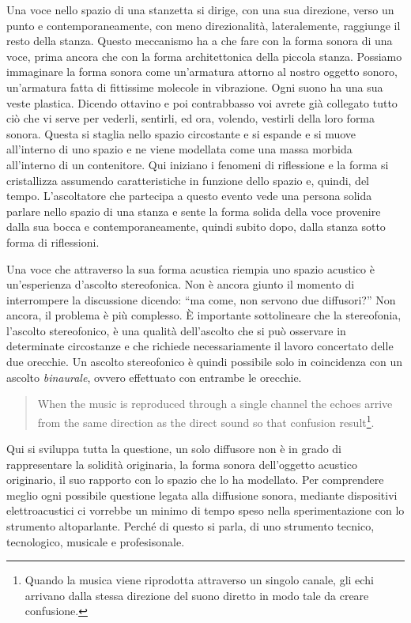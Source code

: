\documentclass[a4paper,11pt]{article}
\begin{document}
Una voce nello spazio di una stanzetta si dirige, con una sua direzione,
verso un punto e contemporaneamente, con meno direzionalità,
lateralemente, raggiunge il resto della stanza. Questo meccanismo ha a
che fare con la forma sonora di una voce, prima ancora che con la forma
architettonica della piccola stanza. Possiamo immaginare la forma sonora
come un'armatura attorno al nostro oggetto sonoro, un'armatura fatta di
fittissime molecole in vibrazione. Ogni suono ha una sua veste plastica.
Dicendo ottavino e poi contrabbasso voi avrete già collegato tutto ciò
che vi serve per vederli, sentirli, ed ora, volendo, vestirli della loro
forma sonora. Questa si staglia nello spazio circostante e si espande e
si muove all'interno di uno spazio e ne viene modellata come una massa
morbida all'interno di un contenitore. Qui iniziano i fenomeni di
riflessione e la forma si cristallizza assumendo caratteristiche in
funzione dello spazio e, quindi, del tempo. L'ascoltatore che partecipa
a questo evento vede una persona solida parlare nello spazio di una
stanza e sente la forma solida della voce provenire dalla sua bocca e
contemporaneamente, quindi subito dopo, dalla stanza sotto forma di
riflessioni.

Una voce che attraverso la sua forma acustica riempia uno spazio
acustico è un'esperienza d'ascolto stereofonica. Non è ancora giunto il
momento di interrompere la discussione dicendo: ``ma come, non servono
due diffusori?'' Non ancora, il problema è più complesso. È importante
sottolineare che la stereofonia, l'ascolto stereofonico, è una qualità
dell'ascolto che si può osservare in determinate circostanze e che
richiede necessariamente il lavoro concertato delle due orecchie. Un
ascolto stereofonico è quindi possibile solo in coincidenza con un
ascolto \emph{binaurale}, ovvero effettuato con entrambe le orecchie.

\begin{quote}
When the music is reproduced through a single channel the echoes
arrive from the same direction as the direct sound so that confusion
result\footnote{Quando la musica viene riprodotta attraverso un singolo canale,
gli echi arrivano dalla stessa direzione del suono diretto in modo
tale da creare confusione.}.
\end{quote}

Qui si sviluppa tutta la questione, un solo diffusore non è in grado di
rappresentare la solidità originaria, la forma sonora dell'oggetto
acustico originario, il suo rapporto con lo spazio che lo ha modellato.
Per comprendere meglio ogni possibile questione legata alla diffusione
sonora, mediante dispositivi elettroacustici ci vorrebbe un minimo di
tempo speso nella sperimentazione con lo strumento altoparlante. Perché
di questo si parla, di uno strumento tecnico, tecnologico, musicale e
profesisonale.
\end{document}
